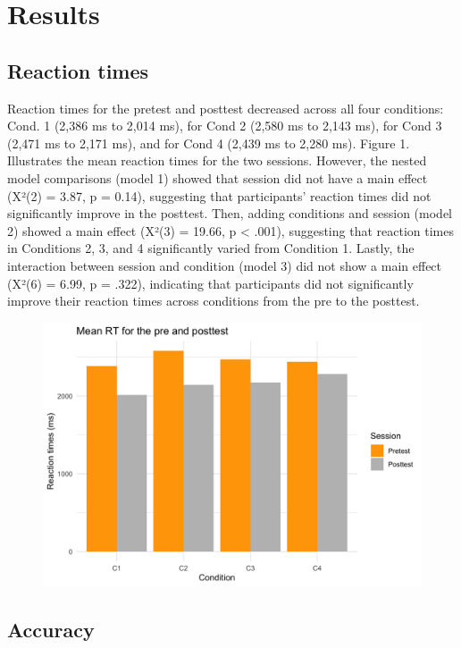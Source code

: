 \documentclass[
  man,floatsintext]{apa6}
\begin{document}
\section{Results}\label{results}

\subsection{Reaction times}\label{reaction-times-1}

Reaction times for the pretest and posttest decreased across all four conditions: Cond. 1 (2,386 ms to 2,014 ms), for Cond 2 (2,580 ms to 2,143 ms), for Cond 3 (2,471 ms to 2,171 ms), and for Cond 4 (2,439 ms to 2,280 ms). Figure 1. Illustrates the mean reaction times for the two sessions. However, the nested model comparisons (model 1) showed that session did not have a main effect (X²(2) = 3.87, p = 0.14), suggesting that participants' reaction times did not significantly improve in the posttest. Then, adding conditions and session (model 2) showed a main effect (X²(3) = 19.66, p \textless{} .001), suggesting that reaction times in Conditions 2, 3, and 4 significantly varied from Condition 1. Lastly, the interaction between session and condition (model 3) did not show a main effect (X²(6) = 6.99, p = .322), indicating that participants did not significantly improve their reaction times across conditions from the pre to the posttest.

\begin{figure}
\includegraphics[width=4.72in]{../Plots/RT_plot} \caption{ }\label{fig:unnamed-chunk-1}
\end{figure}

\subsection{Accuracy}\label{accuracy-1}
\end{document}
